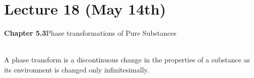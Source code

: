 \section{Lecture 18 (May 14th)}
{\bf Chapter 5.3}\hspace{2ex}Phase transformations of Pure Substances
\\\\
\begin{defi}
A phase transform is a discontinuous change in the properties of a substance as its environment is changed only infinitesimally.
\end{defi}
\vspace{2ex}

